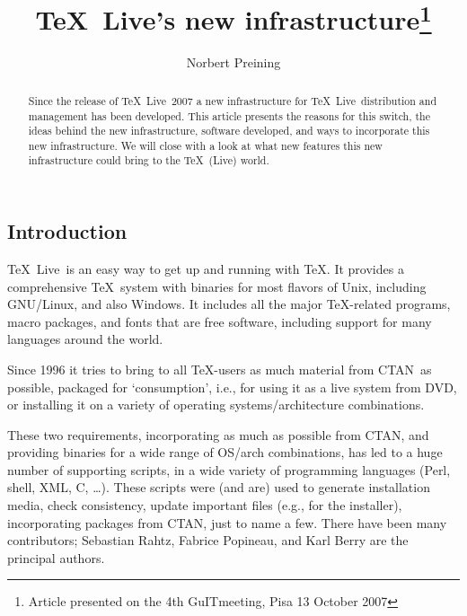 \documentclass{arstexnica}
\newcommand{\tl}{\TeX~Live}
\newcommand{\ctan}{CTAN}
\begin{document}
\begin{article}

\title{\tl's new infrastructure\thanks{%
  Article presented on the 4th GuITmeeting, Pisa 13 October 2007}}

\author{Norbert Preining}
\address{Vienna University of Technology\\
	Wiedner Hauptstr.\ 10\\
	1040 Wien, Austria}

\maketitle


\begin{abstract}
Since the release of \tl~2007 a new infrastructure for \tl\
distribution and management has been developed. This article presents the
reasons for this switch, the ideas behind the new infrastructure,
software developed, and ways to incorporate this new
infrastructure. We will close with a look at what new features
this new infrastructure could bring to the \TeX\ (Live) world.
\end{abstract}

%

\section{Introduction}
\label{sec:intro}

\tl\ is an easy way to get up and running with \TeX. It provides a
comprehensive \TeX\ system with binaries for most flavors of Unix,
including GNU/Linux, and also Windows. It includes all the major
\TeX-related programs, macro packages, and fonts that are free
software, including support for many languages around the world. 

Since 1996 it tries to bring to all \TeX-users as much material
from \ctan\ as possible, packaged for `consumption', i.e., for using it
as a live system from DVD, or installing it on a variety of operating
systems/architecture combinations.

These two requirements, incorporating as much as possible from \ctan,
and providing binaries for a wide range of OS/arch combinations, has led
to a huge number of supporting scripts, in a wide variety of programming
languages (Perl, shell, XML, C, \ldots). These scripts were (and are)
used to generate installation media, check consistency, update
important files (e.g., for the installer), incorporating packages from
\ctan, just to name a few. There have been many contributors; Sebastian
Rahtz, Fabrice Popineau, and Karl Berry are the principal authors.


\end{article}
\end{document}
